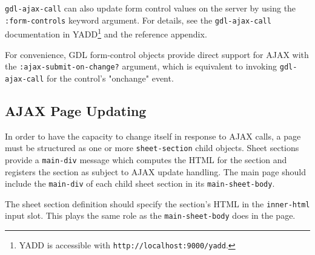 \documentclass [11pt]{book}
\begin{document}
\texttt{gdl-ajax-call} can also update form control values on the server by using the \texttt{:form-controls} keyword argument. For details, see the \texttt{gdl-ajax-call} documentation in
YADD\footnote{YADD is accessible with \texttt{http://localhost:9000/yadd}.} and the reference appendix.



For convenience, GDL form-control objects provide direct support for AJAX with the \texttt{:ajax-submit-on-change?}
argument, which is equivalent to invoking \texttt{gdl-ajax-call} for the control's "onchange" event.



\subsection{AJAX Page Updating}

\label{subsec:ajaxpageupdating}



In order to have the capacity to change itself in response to AJAX calls, a page must be structured
as one or more \texttt{sheet-section} child objects.  Sheet sections provide a \texttt{main-div} message
which computes the HTML for the section and registers the section as subject to AJAX update handling.  The
main page should include the \texttt{main-div} of each child sheet section in its \texttt{main-sheet-body}.



The sheet section definition should specify the section's HTML in the \texttt{inner-html} input slot.
This plays the same role as the \texttt{main-sheet-body} does in the page.
\end{document}
